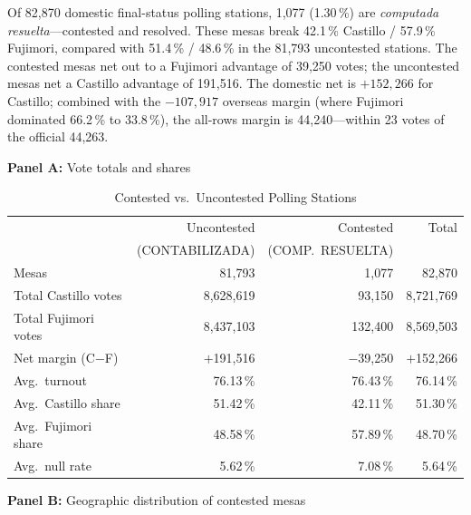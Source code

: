 \documentclass[12pt]{article}
\begin{document}
Of 82,870 domestic final-status polling stations, 1,077 (1.30\,\%) are
\emph{computada resuelta}---contested and resolved. These mesas break
42.1\,\% Castillo / 57.9\,\% Fujimori, compared with 51.4\,\% / 48.6\,\% in
the 81,793 uncontested stations. The contested mesas net out to a Fujimori
advantage of 39,250 votes; the uncontested mesas net a Castillo advantage of
191,516. The domestic net is $+152{,}266$ for Castillo; combined with the
$-107{,}917$ overseas margin (where Fujimori dominated 66.2\,\% to 33.8\,\%),
the all-rows margin is 44,240---within 23 votes of the official 44,263.

\begin{table}[H]
\centering
\caption{Contested vs.\ Uncontested Polling Stations}
\label{tab:contested}
\noindent\textbf{Panel A:} Vote totals and shares
\medskip

\begin{tabular}{lrrr}
\toprule
 & Uncontested & Contested & Total \\
 & (CONTABILIZADA) & (COMP.\ RESUELTA) & \\
\midrule
Mesas & 81,793 & 1,077 & 82,870 \\
Total Castillo votes & 8,628,619 & 93,150 & 8,721,769 \\
Total Fujimori votes & 8,437,103 & 132,400 & 8,569,503 \\
Net margin (C$-$F) & $+$191,516 & $-$39,250 & $+$152,266 \\
\midrule
Avg.\ turnout & 76.13\,\% & 76.43\,\% & 76.14\,\% \\
Avg.\ Castillo share & 51.42\,\% & 42.11\,\% & 51.30\,\% \\
Avg.\ Fujimori share & 48.58\,\% & 57.89\,\% & 48.70\,\% \\
Avg.\ null rate & 5.62\,\% & 7.08\,\% & 5.64\,\% \\
\bottomrule
\end{tabular}

\medskip
\noindent\textbf{Panel B:} Geographic distribution of contested mesas
\medskip


\end{table}
\end{document}
